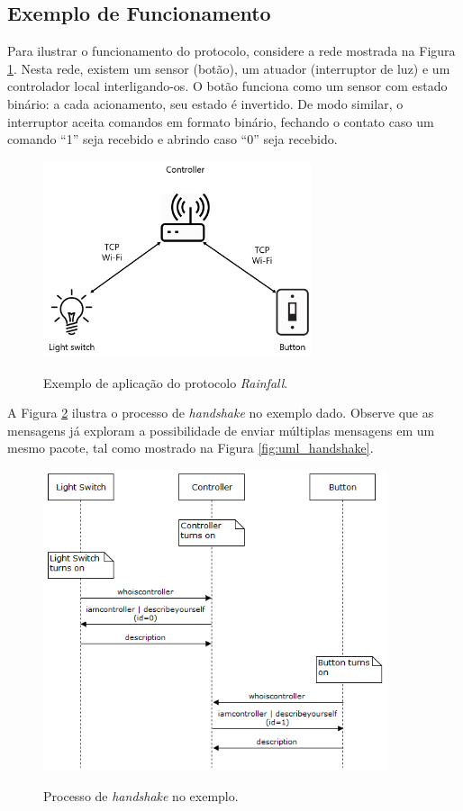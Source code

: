\subsection{Exemplo de Funcionamento}
Para ilustrar o funcionamento do protocolo, considere a rede mostrada na Figura \ref{fig:exemplo_rede}. Nesta rede, existem um sensor (botão), um atuador (interruptor de luz) e um controlador local interligando-os. O botão funciona como um sensor com estado binário: a cada acionamento, seu estado é invertido. De modo similar, o interruptor aceita comandos em formato binário, fechando o contato caso um comando ``1'' seja recebido e abrindo caso ``0'' seja recebido.

\begin{figure}[h]
	\centering
	\caption{Exemplo de aplicação do protocolo \textit{Rainfall}.}
	\includegraphics[width=0.7\textwidth]{imagens/exemplo_rede.png}
 	\label{fig:exemplo_rede}
\end{figure}

A Figura \ref{fig:exemplo_handshake} ilustra o processo de \textit{handshake} no exemplo dado. Observe que as mensagens já exploram a possibilidade de enviar múltiplas mensagens em um mesmo pacote, tal como mostrado na Figura \ref{fig:uml_handshake}.

\begin{figure}[hp]
	\centering
	\caption{Processo de \textit{handshake} no exemplo.}
	\includegraphics[width=0.9\textwidth]{imagens/exemplo_handshake.png}
 	\label{fig:exemplo_handshake}
\end{figure}


